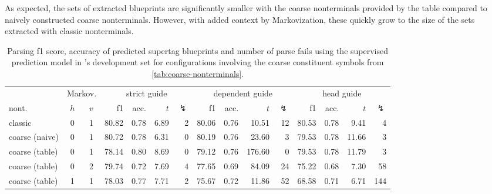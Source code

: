\documentclass[../../document.tex]{subfiles}
\begin{document}
    As expected, the sets of extracted blueprints are significantly smaller with the coarse nonterminals provided by the table compared to naively constructed coarse nonterminals.
    However, with added context by Markovization, these quickly grow to the size of the sets extracted with classic nonterminals.
    
    \begin{table}
        \caption{\label{tbl:gridsearch:coarse:2}
        Parsing f1 score, accuracy of predicted supertag blueprints and number of parse fails using the supervised prediction model in \negra{}'s development set for configurations involving the coarse constituent symbols from \cref{tab:coarse-nonterminals}.
        }
        \centering
        \vspace{.2cm}
        \setlength{\tabcolsep}{3.4pt}
        \begin{tabular}{lcc|rrrr|rrrr|rrrr}
            \toprule
& \multicolumn{2}{c|}{Markov.}         & \multicolumn{4}{c|}{strict guide} &  \multicolumn{4}{c|}{dependent guide} &  \multicolumn{4}{c}{head guide} \\
nont.           & \(h\) & \(v\) & f1 & acc. & $t$ & $\lightning$ & f1 & acc. & $t$ & $\lightning$  & f1 & acc. & $t$ & $\lightning$  \\ \hline\rowcolor{black!10}
classic        & 0 & 1 & 80.82 & 0.78 & 6.89 & 2 & 80.06 & 0.76 &  10.51 & 12 & 80.53 & 0.78 &  9.41 & 4 \\\rowcolor{black!10}
coarse (naive) & 0 & 1 & 80.72 & 0.78 & 6.31 & 0 & 80.19 & 0.76 &  23.60 &  3 & 79.53 & 0.78 & 11.66 & 3 \\\hline
coarse (table) & 0 & 1 & 78.14 & 0.80 & 8.69 & 0 & 79.12 & 0.76 & 176.60 &  0 & 79.53 & 0.78 & 11.79 & 3 \\
coarse (table) & 0 & 2 & 79.74 & 0.72 & 7.69 & 4 & 77.65 & 0.69 &  84.09 & 24 & 75.22 & 0.68 &  7.30 & 58 \\
coarse (table) & 1 & 1 & 78.03 & 0.77 & 7.71 & 2 & 75.67 & 0.72 &  11.86 & 52 & 68.58 & 0.71 &  6.71 & 144 \\
\bottomrule
        \end{tabular}
    \end{table}
\end{document}
